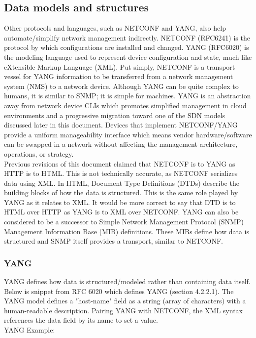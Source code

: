 \subsection{Data models and structures}
Other protocols and languages, such as NETCONF and YANG, also help
automate/simplify network management indirectly. NETCONF (RFC6241) is the
protocol by which configurations are installed and changed. YANG (RFC6020) is
the modeling language used to represent device configuration and state, much
like eXtensible Markup Language (XML). Put simply, NETCONF is a transport
vessel for YANG information to be transferred from a network management system
(NMS) to a network device. Although YANG can be quite complex to humans, it is
similar to SNMP; it is simple for machines. YANG is an abstraction away from
network device CLIs which promotes simplified management in cloud environments
and a progressive migration toward one of the SDN models discussed later in
this document. Devices that implement NETCONF/YANG provide a uniform
manageability interface which means vendor hardware/software can be swapped in
a network without affecting the management architecture, operations, or strategy. \\

Previous revisions of this document claimed that NETCONF is to YANG as HTTP is
to HTML. This is not technically accurate, as NETCONF serializes data using
XML. In HTML, Document Type Definitions (DTDs) describe the building blocks of
how the data is structured. This is the same role played by YANG as it relates
to XML. It would be more correct to say that DTD is to HTML over HTTP as YANG
is to XML over NETCONF. YANG can also be considered to be a successor to
Simple Network Management Protocol (SNMP) Management Information Base (MIB)
definitions. These MIBs define how data is structured and SNMP itself provides
a transport, similar to NETCONF.

\subsubsection{YANG}
YANG defines how data is structured/modeled rather than containing data
itself. Below is snippet from RFC 6020 which defines YANG (section 4.2.2.1).
The YANG model defines a "host-name" field as a string (array of characters)
with a human-readable description. Pairing YANG with NETCONF, the XML syntax
references the data field by its name to set a value. \\

YANG Example:

